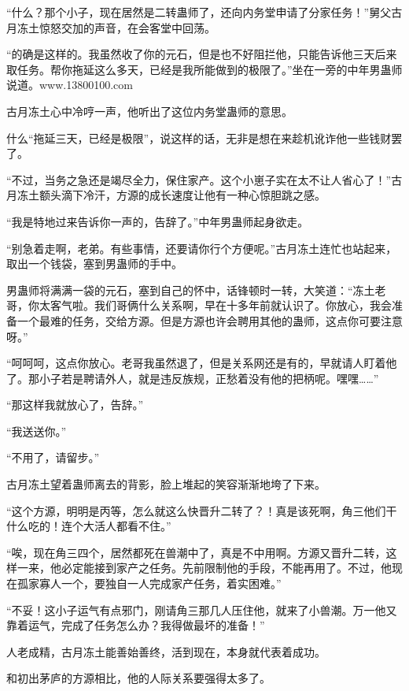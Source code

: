
\begin{this_body}

“什么？那个小子，现在居然是二转蛊师了，还向内务堂申请了分家任务！”舅父古月冻土惊怒交加的声音，在会客堂中回荡。

“的确是这样的。我虽然收了你的元石，但是也不好阻拦他，只能告诉他三天后来取任务。帮你拖延这么多天，已经是我所能做到的极限了。”坐在一旁的中年男蛊师说道。www.13800100.com

古月冻土心中冷哼一声，他听出了这位内务堂蛊师的意思。

什么“拖延三天，已经是极限”，说这样的话，无非是想在来趁机讹诈他一些钱财罢了。

“不过，当务之急还是竭尽全力，保住家产。这个小崽子实在太不让人省心了！”古月冻土额头滴下冷汗，方源的成长速度让他有一种心惊胆跳之感。

“我是特地过来告诉你一声的，告辞了。”中年男蛊师起身欲走。

“别急着走啊，老弟。有些事情，还要请你行个方便呢。”古月冻土连忙也站起来，取出一个钱袋，塞到男蛊师的手中。

男蛊师将满满一袋的元石，塞到自己的怀中，话锋顿时一转，大笑道：“冻土老哥，你太客气啦。我们哥俩什么关系啊，早在十多年前就认识了。你放心，我会准备一个最难的任务，交给方源。但是方源也许会聘用其他的蛊师，这点你可要注意呀。”

“呵呵呵，这点你放心。老哥我虽然退了，但是关系网还是有的，早就请人盯着他了。那小子若是聘请外人，就是违反族规，正愁着没有他的把柄呢。嘿嘿……”

“那这样我就放心了，告辞。”

“我送送你。”

“不用了，请留步。”

古月冻土望着蛊师离去的背影，脸上堆起的笑容渐渐地垮了下来。

“这个方源，明明是丙等，怎么就这么快晋升二转了？！真是该死啊，角三他们干什么吃的！连个大活人都看不住。”

“唉，现在角三四个，居然都死在兽潮中了，真是不中用啊。方源又晋升二转，这样一来，他必定能接到家产之任务。先前限制他的手段，不能再用了。不过，他现在孤家寡人一个，要独自一人完成家产任务，着实困难。”

“不妥！这小子运气有点邪门，刚请角三那几人压住他，就来了小兽潮。万一他又靠着运气，完成了任务怎么办？我得做最坏的准备！”

人老成精，古月冻土能善始善终，活到现在，本身就代表着成功。

和初出茅庐的方源相比，他的人际关系要强得太多了。


\end{this_body}
